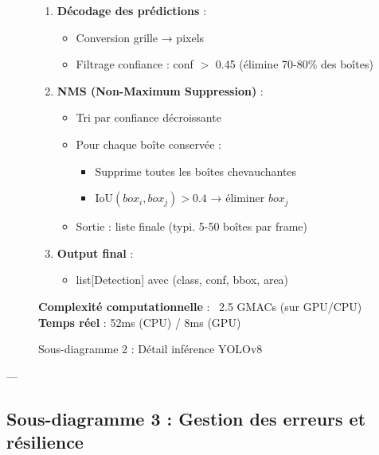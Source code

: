 \begin{figure}[H]
{\begin{minipage}{0.95\textwidth}
\begin{enumerate}
        \item[\textbf{Étape 5}] \textbf{Décodage des prédictions} :
        \begin{itemize}
            \item Conversion grille → pixels
            \item Filtrage confiance : conf $>$ 0.45 (élimine 70-80\% des boîtes)
        \end{itemize}
        
        \item[\textbf{Étape 6}] \textbf{NMS (Non-Maximum Suppression)} :
        \begin{itemize}
            \item Tri par confiance décroissante
            \item Pour chaque boîte conservée :
            \begin{itemize}
                \item Supprime toutes les boîtes chevauchantes
                \item $\text{IoU}(box_i, box_j) > 0.4$ → éliminer $box_j$
            \end{itemize}
            \item Sortie : liste finale (typi. 5-50 boîtes par frame)
        \end{itemize}
        
        \item[\textbf{Étape 7}] \textbf{Output final} : 
        \begin{itemize}
            \item list[Detection] avec (class, conf, bbox, area)
        \end{itemize}
    \end{enumerate}
    
    \vspace{0.3cm}
    
    \textbf{Complexité computationnelle} : ~2.5 GMACs (sur GPU/CPU)
    \textbf{Temps réel} : 52ms (CPU) / 8ms (GPU)
    
    \end{minipage}}
    \caption{Sous-diagramme 2 : Détail inférence YOLOv8}
    \label{fig:seq-yolo-detail}
\end{figure}

---

\subsection{Sous-diagramme 3 : Gestion des erreurs et résilience}

